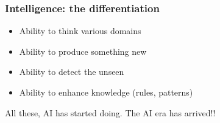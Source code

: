 %
%
%

\begin{frame}[fragile]\frametitle{ Intelligence: the differentiation}
\begin{itemize}
\item Ability to think various domains
\item Ability to produce something new
\item Ability to detect the unseen
\item Ability to enhance knowledge (rules, patterns)
\end{itemize}
All these, AI has started doing. The AI era has arrived!!
\end{frame}








